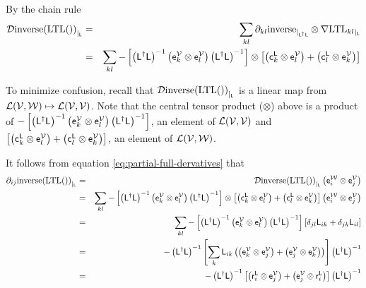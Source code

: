 By the chain rule
\begin{eqnarray}
{\mathcal{D}{\mathrm{inverse}(\mathrm{LTL}())}_{\mid_{\mathsf{L}}}}
& = &
\sum_{kl}
{\partial}_{kl}{\mathrm{inverse}}_{\mid_{\mathsf{L}^{\dagger}\mathsf{L}}}
\otimes
{\mathbf \nabla}{\mathrm{LTL}_{kl}}_{\mid_{\mathsf{L}}}
\\
& = &
\sum_{kl}
- \left[
\left( \mathsf{L}^{\dagger} \mathsf{L} \right)^{-1}
\left( \mathsf{e}_k^{\mathcal{V}} \otimes \mathsf{e}_l^{\mathcal{V}} \right)
\left( \mathsf{L}^{\dagger} \mathsf{L} \right)^{-1}
\right]
\otimes
\left[
\left( \mathsf{c}_k^{\mathsf{L}} \otimes \mathsf{e}_l^{\mathcal{V}} \right)
+
\left( \mathsf{c}_l^{\mathsf{L}} \otimes \mathsf{e}_k^{\mathcal{V}} \right)
\right]
\nonumber
\end{eqnarray}

To minimize confusion,
recall that ${\mathcal{D}{\mathrm{inverse}(\mathrm{LTL}())}_{\mid_{\mathsf{L}}}}$ is
a linear map from $\mathcal{L}(\mathcal{V},\mathcal{W}) \mapsto \mathcal{L}(\mathcal{V},\mathcal{V})$.
Note that the central tensor product ($\otimes$) above
is a product of
$
- \left[
\left( \mathsf{L}^{\dagger} \mathsf{L} \right)^{-1}
\left( \mathsf{e}_k^{\mathcal{V}} \otimes \mathsf{e}_l^{\mathcal{V}} \right)
\left( \mathsf{L}^{\dagger} \mathsf{L} \right)^{-1}
\right]
$,
an element of $\mathcal{L}(\mathcal{V},\mathcal{V})$
and
$
\left[
\left( \mathsf{c}_k^{\mathsf{L}} \otimes \mathsf{e}_l^{\mathcal{V}} \right)
+
\left( \mathsf{c}_l^{\mathsf{L}} \otimes \mathsf{e}_k^{\mathcal{V}} \right)
\right]
$,
an element of $\mathcal{L}(\mathcal{V},\mathcal{W})$.

It follows from equation \ref{eq:partial-full-dervatives} that
\begin{eqnarray}
{\partial}_{ij}{\mathrm{inverse}(\mathrm{LTL}())}_{\mid_{\mathsf{L}}}
& = &
{\mathcal{D}{\mathrm{inverse}(\mathrm{LTL}())}_{\mid_{\mathsf{L}}}}
\left( \mathsf{e}_i^{\mathcal{W}} \otimes \mathsf{e}_j^{\mathcal{V}} \right)
\\
& = &
\sum_{kl}
- \left[
\left( \mathsf{L}^{\dagger} \mathsf{L} \right)^{-1}
\left( \mathsf{e}_k^{\mathcal{V}} \otimes \mathsf{e}_l^{\mathcal{V}} \right)
\left( \mathsf{L}^{\dagger} \mathsf{L} \right)^{-1}
\right]
\otimes
\left[
\left( \mathsf{c}_k^{\mathsf{L}} \otimes \mathsf{e}_l^{\mathcal{V}} \right)
+
\left( \mathsf{c}_l^{\mathsf{L}} \otimes \mathsf{e}_k^{\mathcal{V}} \right)
\right]
\left( \mathsf{e}_i^{\mathcal{W}} \otimes \mathsf{e}_j^{\mathcal{V}} \right)
\nonumber
\\
& = &
\sum_{kl}
- \left[
\left( \mathsf{L}^{\dagger} \mathsf{L} \right)^{-1}
\left( \mathsf{e}_k^{\mathcal{V}} \otimes \mathsf{e}_l^{\mathcal{V}} \right)
\left( \mathsf{L}^{\dagger} \mathsf{L} \right)^{-1}
\right]
\left[
\delta_{jl}
\mathsf{L}_{ik}
+
\delta_{jk}
\mathsf{L}_{il}
\right]
\nonumber
\\
& = &
-
\left( \mathsf{L}^{\dagger} \mathsf{L} \right)^{-1}
\left[
\sum_{k}
\mathsf{L}_{ik}
\left(
\left( \mathsf{e}_k^{\mathcal{V}} \otimes \mathsf{e}_j^{\mathcal{V}} \right)
+
\left( \mathsf{e}_j^{\mathcal{V}} \otimes \mathsf{e}_k^{\mathcal{V}} \right)
\right)
\right]
\left( \mathsf{L}^{\dagger} \mathsf{L} \right)^{-1}
\nonumber
\\
& = &
-
\left( \mathsf{L}^{\dagger} \mathsf{L} \right)^{-1}
\left[
\left( \mathsf{r}_i^{\mathsf{L}} \otimes \mathsf{e}_j^{\mathcal{V}} \right)
+
\left( \mathsf{e}_j^{\mathcal{V}} \otimes \mathsf{r}_i^{\mathsf{L}} \right)
\right]
\left( \mathsf{L}^{\dagger} \mathsf{L} \right)^{-1}
\nonumber
\end{eqnarray}

